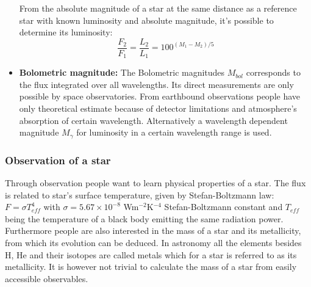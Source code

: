 \begin{itemize}
From the absolute magnitude of a star at the same distance as a reference star with known luminosity and absolute magnitude, it's possible to determine its luminosity:
\begin{equation}
\label{Lumi}
	\frac{F_2}{F_1}=\frac{L_2}{L_1}=100^{(M_1-M_2)/5}
\end{equation}

\item\textbf{Bolometric magnitude:}
The Bolometric magnitudes  $M_{bol}$ corresponds to the flux integrated over all wavelengths. Its direct measurements are only possible by space observatories. From earthbound observations people have only theoretical estimate because of detector limitations and atmosphere's absorption of certain wavelength. Alternatively a wavelength dependent magnitude $M_{\gamma}$ for luminosity in a certain wavelength range is used.
\end{itemize}

\subsubsection{Observation of a star}
Through observation people want to learn physical properties of a star. The flux is related to star's surface temperature, given by Stefan-Boltzmann law: $F=\sigma T_{eff}^4$ with $\sigma = 5.67\times10^{-8}$ Wm$^{-2}$K$^{-4}$ Stefan-Boltzmann constant and $T_{eff}$ being the temperature of a black body emitting the same radiation power. Furthermore people are also interested in the mass of a star and its metallicity, from which its evolution can be deduced. In astronomy all the elements besides H, He and their isotopes are called metals which for a star is referred to as its metallicity. It is however not trivial to calculate the mass of a star from easily accessible observables.
\hspace{4mm}\\
